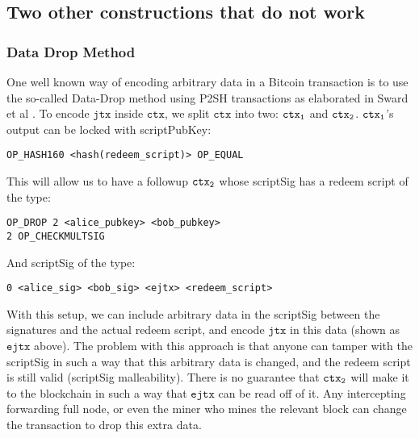 \subsection{Two other constructions that do not work}

\subsubsection{Data Drop Method}
One well known way of encoding arbitrary data in a Bitcoin transaction is to use the so-called Data-Drop method using P2SH transactions as elaborated in Sward et al \cite{sward2018data}. To encode $\texttt{jtx}$ inside $\texttt{ctx}$, we split $\texttt{ctx}$ into two: $\texttt{ctx\textsubscript{1}}$ and $\texttt{ctx\textsubscript{2}}$. $\texttt{ctx\textsubscript{1}}$'s output can be locked with scriptPubKey:
\begin{verbatim}
OP_HASH160 <hash(redeem_script)> OP_EQUAL
\end{verbatim}

This will allow us to have a followup $\texttt{ctx\textsubscript{2}}$ whose scriptSig has a redeem script of the type:
\begin{verbatim}
OP_DROP 2 <alice_pubkey> <bob_pubkey>
2 OP_CHECKMULTSIG
\end{verbatim}

And scriptSig of the type:
\noindent
\begin{verbatim}
0 <alice_sig> <bob_sig> <ejtx> <redeem_script>
\end{verbatim}

With this setup, we can include arbitrary data in the scriptSig between the signatures and the actual redeem script, and encode $\texttt{jtx}$ in this data (shown as $\texttt{ejtx}$ above). The problem with this approach is that anyone can tamper with the scriptSig in such a way that this arbitrary data is changed, and the redeem script is still valid (scriptSig malleability). There is no guarantee that $\texttt{ctx\textsubscript{2}}$ will make it to the blockchain in such a way that $\texttt{ejtx}$ can be read off of it. Any intercepting forwarding full node, or even the miner who mines the relevant block can change the transaction to drop this extra data.

